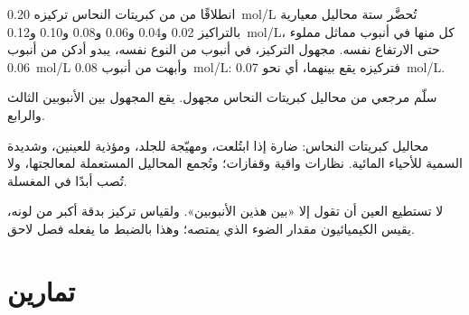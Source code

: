 \begin{example}[سلّم أزرق]\label{ex:g10:concentration-and-dilution:scale}
انطلاقًا من  من كبريتات النحاس تركيزه \qty{0.20}{mol/L} تُحضَّر ستة
محاليل معيارية بالتراكيز 0.02 و0.04 و0.06 و0.08 و0.10
و\qty{0.12}{mol/L}، كل منها في أنبوب مماثل مملوء حتى الارتفاع نفسه.
 مجهول التركيز، في أنبوب من النوع نفسه، يبدو أدكن من أنبوب
\qty{0.06}{mol/L} وأبهت من أنبوب
\qty{0.08}{mol/L}: فتركيزه يقع بينهما، أي نحو
\qty{0.07}{mol/L}.
\end{example}

\begin{omfigure}

{\small سلّم مرجعي من محاليل كبريتات النحاس  مجهول. يقع المجهول بين
الأنبوبين الثالث والرابع.}
\end{omfigure}

\begin{safety}{}
محاليل كبريتات النحاس: ضارة إذا ابتُلعت، ومهيّجة للجلد، ومؤذية للعينين،
وشديدة السمية للأحياء المائية. نظارات واقية وقفازات؛ وتُجمع المحاليل المستعملة
لمعالجتها، ولا تُصب أبدًا في المغسلة.
\end{safety}

\begin{remark}\label{rem:g10:concentration-and-dilution:eye}
لا تستطيع العين أن تقول إلا «بين هذين الأنبوبين». ولقياس تركيز  بدقة
أكبر من لونه، يقيس الكيميائيون مقدار الضوء الذي يمتصه؛ وهذا بالضبط ما يفعله
فصل لاحق.
\end{remark}

\section{تمارين}


